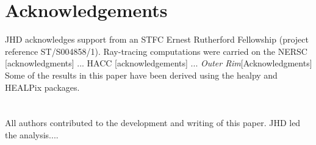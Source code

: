 \section*{Acknowledgements}

JHD acknowledges support from an STFC Ernest Rutherford Fellowship (project reference ST/S004858/1). 
Ray-tracing computations were carried on the NERSC [acknowledgments] ... HACC [acknowledgements] ... {\it Outer Rim}[Acknowledgments]
\\

Some of the results in this paper have been derived using the {\sc healpy} and {\sc HEALPix} packages.
\\
\\
\\
{\footnotesize All authors contributed to the development and writing of this paper.
JHD led the analysis.... }
